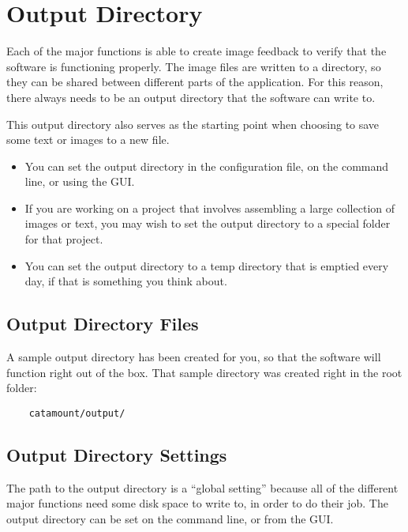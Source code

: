 \chapter{Output Directory}
\hypertarget{output-directory}{}

Each of the major functions is able to create image feedback to verify
that the software is functioning properly. The image files are written
to a directory, so they can be shared between different parts of the
application. For this reason, there always needs to be an output
directory that the software can write to.

This output directory also serves as the starting point when choosing
to save some text or images to a new file.

\begin{itemize}

\item You can set the output directory in the configuration file, on
  the command line, or using the GUI.

\item If you are working on a project that involves assembling a large
  collection of images or text, you may wish to set the output
  directory to a special folder for that project.

\item You can set the output directory to a temp directory that is
  emptied every day, if that is something you think about.

\end{itemize}

\section{Output Directory Files}

A sample output directory has been created for you, so that the
software will function right out of the box. That sample directory was
created right in the root folder:

\begin{verbatim}
    catamount/output/
\end{verbatim}

\section{Output Directory Settings}

The path to the output directory is a ``global setting'' because all
of the different major functions need some disk space to write to, in
order to do their job. The output directory can be set on the command
line, or from the GUI.

